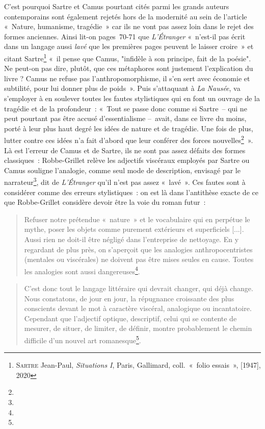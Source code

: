 \documentclass[12pt, a4paper]{article}
\begin{document}
C'est pourquoi Sartre et Camus pourtant cités parmi les grands auteurs contemporains sont également rejetés hors de la modernité au sein de l'article «~Nature, humanisme, tragédie~» car ils ne vont pas assez loin dans le rejet des formes anciennes. Ainsi lit-on pages~70-71 que \textit{L'Étranger} «~n’est-il pas écrit dans un langage aussi \textit{lavé} que les premières pages peuvent le laisser croire~» et citant Sartre\footnote{\textsc{Sartre} Jean-Paul, \textit{Situations I}, Paris, Gallimard, coll.~«~folio essais~», [1947], 2020} «~il pense que Camus, "infidèle à son principe, fait de la poésie". Ne peut-on pas dire, plutôt, que ces métaphores sont justement l’explication du livre ? Camus ne refuse pas l’anthropomorphisme, il s’en sert avec économie et subtilité, pour lui donner plus de poids~». Puis s'attaquant à \textit{La Nausée}, \robbe{} va s'employer à en soulever toutes les fautes stylistiques qui en font un ouvrage de la tragédie et de la profondeur~: «~Tout se passe donc comme si Sartre~– qui ne peut pourtant pas être accusé d’essentialisme –~avait, dans ce livre du moins, porté à leur plus haut degré les idées de nature et de tragédie. Une fois de plus, lutter contre ces idées n’a fait d’abord que leur conférer des forces nouvelles\footnote{}~».
Là est l'erreur de Camus et de Sartre, ils ne sont pas assez défaits des formes classiques~: Robbe-Grillet relève les adjectifs viscéraux employés par Sartre ou Camus souligne l'analogie, comme seul mode de description, envisagé par le narrateur\footnote{}, dit de \textit{L'Étranger} qu'il n'est pas assez «~lavé~». Ces fautes sont à considérer comme des erreurs stylistiques~: on est là dans l'antithèse exacte de ce que Robbe-Grillet considère devoir être la voie du roman futur~:

\begin{quote}
    Refuser notre prétendue «~nature~» et le vocabulaire qui en perpétue le mythe, poser les objets comme purement extérieurs et superficiels [...]. Aussi rien ne doit-il être négligé dans l’entreprise de nettoyage. En y regardant de plus près, on s’aperçoit que les analogies anthropocentristes (mentales ou viscérales) ne doivent pas être mises seules en cause. Toutes les analogies sont aussi dangereuses\footnote{}.
\end{quote}

\begin{quote}
    C’est donc tout le langage littéraire qui devrait changer, qui déjà change. Nous constatons, de jour en jour, la répugnance croissante des plus conscients devant le mot à caractère viscéral, analogique ou incantatoire. Cependant que l’adjectif optique, descriptif, celui qui se contente de mesurer, de situer, de limiter, de définir, montre probablement le chemin difficile d’un nouvel art romanesque\footnote{}.
\end{quote}
\end{document}

